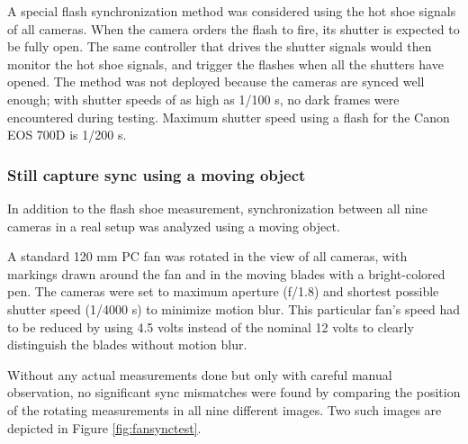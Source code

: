 A special flash synchronization method was considered using the hot shoe signals of all cameras.
When the camera orders the flash to fire, its shutter is expected to be fully open.
The same controller that drives the shutter signals would then monitor the hot shoe signals, and trigger the flashes when all the shutters have opened.
The method was not deployed because the cameras are synced well enough; with shutter speeds of as high as 1/100 s, no dark frames were encountered during testing.
Maximum shutter speed using a flash for the Canon EOS 700D is 1/200 s.

\subsubsection{Still capture sync using a moving object}

In addition to the flash shoe measurement, synchronization between all nine cameras in a real setup was analyzed using a moving object.

A standard 120 mm PC fan was rotated in the view of all cameras, with markings drawn around the fan and in the moving blades with a bright-colored pen.
The cameras were set to maximum aperture (f/1.8) and shortest possible shutter speed (1/4000 s) to minimize motion blur.
This particular fan's speed had to be reduced by using 4.5 volts instead of the nominal 12 volts to clearly distinguish the blades without motion blur.

Without any actual measurements done but only with careful manual observation, no significant sync mismatches were found by comparing the position of the rotating measurements in all nine different images.
Two such images are depicted in Figure \ref{fig:fansynctest}.


%

